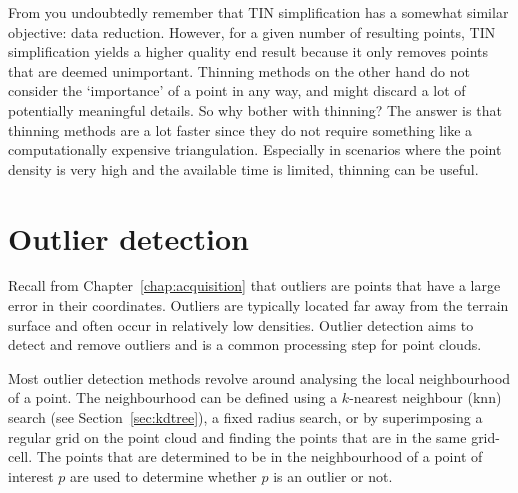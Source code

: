 From  you undoubtedly remember that TIN simplification has a somewhat similar objective: data reduction. 
However, for a given number of resulting points, TIN simplification yields a higher quality end result because it only removes points that are deemed unimportant.
Thinning methods on the other hand do not consider the `importance' of a point in any way, and might discard a lot of potentially meaningful details.
So why bother with thinning? The answer is that thinning methods are a lot faster since they do not require something like a computationally expensive triangulation.
Especially in scenarios where the point density is very high and the available time is limited, thinning can be useful.


%
\section{Outlier detection}
Recall from Chapter~\ref{chap:acquisition} that outliers are points that have a large error in their coordinates.
Outliers are typically located far away from the terrain surface and often occur in relatively low densities.
Outlier detection aims to detect and remove outliers and is a common processing step for point clouds.

Most outlier detection methods revolve around analysing the local neighbourhood of a point.
The neighbourhood can be defined using a $k$-nearest neighbour (knn) search (see Section~\ref{sec:kdtree}), a fixed radius search, or by superimposing a regular grid on the point cloud and finding the points that are in the same grid-cell.
The points that are determined to be in the neighbourhood of a point of interest $p$ are used to determine whether $p$ is an outlier or not.


